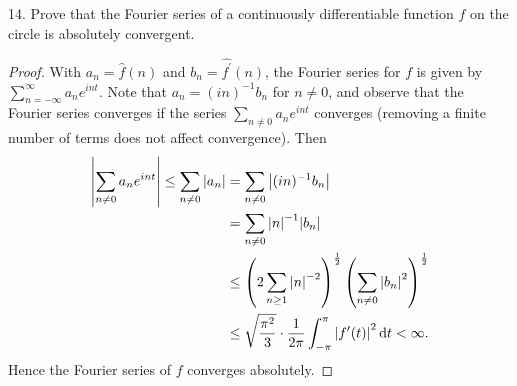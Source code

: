 \documentclass[11pt]{article}
\newcommand{\br}[1]{\left(#1\right)}
\begin{document}
14. Prove that the Fourier series of a continuously differentiable function $f$ on the circle is absolutely convergent.
\begin{proof}
  With $a_n = \hat{f}(n)$ and $b_n = \widehat{f^{\prime}}(n)$, the Fourier series for $f$ is given by $\sum_{n=-\infty}^{\infty} a_n e^{int}$. Note that $a_n = (in)^{-1}b_n $ for $n\neq 0$, and observe that the Fourier series converges if the series $\sum_{n\neq 0} a_n e^{int}$ converges (removing a finite number of terms does not affect convergence). Then
  \begin{align*}
    \abs{\sum_{n\neq 0} a_n e^{int}} \leq \sum_{n\neq 0} \abs{a_n} &= \sum_{n\neq 0} \abs{(in)^{-1}b_n}\\
    &= \sum_{n\neq 0} \abs{n}^{-1}\abs{b_n}\\
    &\leq \br{2\sum_{n\geq 1}\abs{n}^{-2}}^{\frac{1}{2}}\br{\sum_{n\neq 0} \abs{b_n}^2}^{\frac{1}{2}}\\
    &\leq \sqrt{\frac{\pi^2}{3}}\cdot \frac{1}{2\pi}\int_{-\pi}^{\pi}\abs{f^{\prime}(t)}^2\dd{t} < \infty.
  \end{align*}
  Hence the Fourier series of $f$ converges absolutely.
\end{proof}
\end{document}
